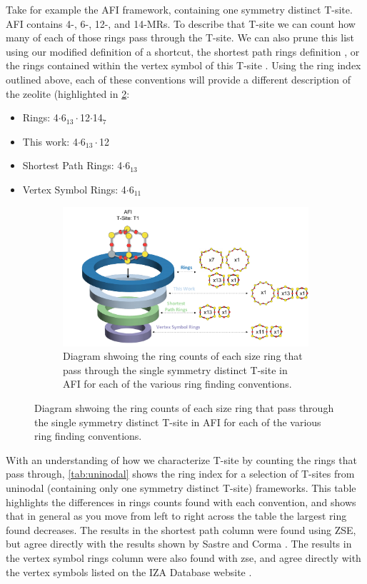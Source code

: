\documentclass[11pt]{article}
\begin{document}
Take for example the AFI framework, containing one symmetry distinct T-site. AFI contains 4-, 6-, 12-, and 14-MRs. To describe that T-site we can count how many of each of those rings pass through the T-site. We can also prune this list using our modified definition of a shortcut, the shortest path rings definition \cite{sastre-topological-2009}, or the rings contained within the vertex symbol of this T-site \cite{okeeffe-vertex-1997}. Using the ring index outlined above, each of these conventions will provide a different description of the zeolite (highlighted in \cref{fig:afi-funnel}:
\begin{itemize}
\item Rings: 4\(\cdot\)6\(_{\text{13}} \cdot\)12\(\cdot\)14\(_{\text{7}}\)
\item This work: 4\(\cdot\)6\(_{\text{13}} \cdot\)12
\item Shortest Path Rings: 4\(\cdot\)6\(_{\text{13}}\)
\item Vertex Symbol Rings: 4\(\cdot\)6\(_{\text{11}}\)
\end{itemize}

\begin{figure}
\begin{figure}[H]
\centering
\includegraphics[width=\textwidth]{figures/chapter-3/afi-funnel.pdf}
\caption{Diagram shwoing the ring counts of each size ring that pass through the single symmetry distinct T-site in AFI for each of the various ring finding conventions. \label{fig:afi-funnel}}
\end{figure}
\end{figure}

With an understanding of how we characterize T-site by counting the rings that pass through, \cref{tab:uninodal} shows the ring index for a selection of T-sites from uninodal (containing only one symmetry distinct T-site) frameworks. This table highlights the differences in rings counts found with each convention, and shows that in general as you move from left to right across the table the largest ring found decreases. The results in the shortest path column were found using ZSE, but agree directly with the results shown by Sastre and Corma \cite{sastre-topological-2009}. The results in the vertex symbol rings column were also found with zse, and agree directly with the vertex symbols listed on the IZA Database website \cite{baerlocher-database-nodate}.  
\end{document}
